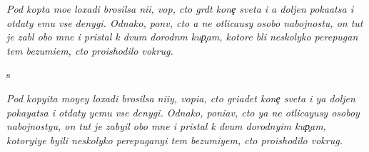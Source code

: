 \documentclass[10pt]{article}
\begin{document}
\noindent\textit{Pod kop{\yi}ta mo{\y}e{\y} loxadi brosilsa ni{\x}i{\y}, vop{\ia}, cto gr{\ia}d{\e}t kone{\c} sveta i {\y}a doljen poka{\y}atsa i otdaty {\y}emu vse denygi. Odnako, pon{\ia}v, cto {\y}a ne otlica{\y}usy osobo{\y} nabojnost{\y}u, on tut je zab{\yi}l obo mne i pristal k dvum dorodn{\yi}m kup{\c}am, kotor{\yi}{\y}e b{\yi}li neskolyko perepugan{\yi} tem bezumi{\y}em, cto proishodilo vokrug.}

\noindent s

\noindent\textit{Pod kopyita moyey loxadi brosilsa ni{\x}iy, vopia, cto griadet kone{\c} sveta i ya doljen pokayatsa i otdaty yemu vse denygi. Odnako, poniav, cto ya ne otlicayusy osoboy nabojnostyu, on tut je zabyil obo mne i pristal k dvum dorodnyim kup{\c}am, kotoryiye byili neskolyko perepuganyi tem bezumiyem, cto proishodilo vokrug.}
\end{document}
